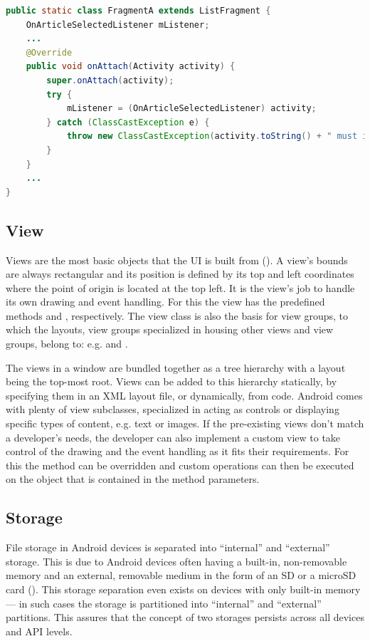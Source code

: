 \vspace*{0.5cm}
\begin{lstlisting}[language=JAVA, caption=Example code for enforcing the implementation of a callback interface, label=lst:callback_interface]
public static class FragmentA extends ListFragment {
    OnArticleSelectedListener mListener;
    ...
    @Override
    public void onAttach(Activity activity) {
        super.onAttach(activity);
        try {
            mListener = (OnArticleSelectedListener) activity;
        } catch (ClassCastException e) {
            throw new ClassCastException(activity.toString() + " must implement OnArticleSelectedListener");
        }
    }
    ...
}
\end{lstlisting}

\subsection{View}
Views are the most basic objects that the \gls{UI} is built from (\cite{android_view}). A view's bounds are always rectangular and its position is defined by its top and left coordinates where the point of origin is located at the top left. It is the view's job to handle its own drawing and event handling. For this the view has the predefined methods  and , respectively. The view class is also the basis for view groups, to which the layouts, view groups specialized in housing other views and view groups, belong to: e.g.  and .

The views in a window are bundled together as a tree hierarchy with a layout being the top-most root. Views can be added to this hierarchy statically, by specifying them in an \gls{XML} layout file, or dynamically, from code. Android comes with plenty of view subclasses, specialized in acting as controls or displaying specific types of content, e.g. text or images. If the pre-existing views don't match a developer's needs, the developer can also implement a custom view to take control of the drawing and the event handling as it fits their requirements. For this the  method can be overridden and custom operations can then be executed on the  object that is contained in the method parameters.

\subsection{Storage}
\label{android_storage}
File storage in Android devices is separated into ``internal'' and ``external'' storage. This is due to Android devices often having a built-in, non-removable memory and an external, removable medium in the form of an SD or a microSD card (\cite{android_storage}). This storage separation even exists on devices with only built-in memory --- in such cases the storage is partitioned into ``internal'' and ``external'' partitions. This assures that the concept of two storages persists across all devices and \gls{API} levels.

